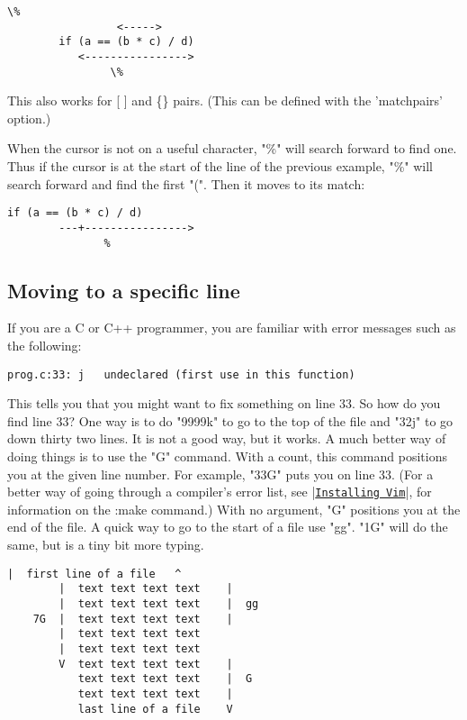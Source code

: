 \begin{Verbatim}[samepage=true]
                   \%
                 <----->
        if (a == (b * c) / d) 
           <---------------->
                \%
\end{Verbatim}

This also works for [ ] and \{\} pairs.
(This can be defined with the 'matchpairs' option.)

When the cursor is not on a useful character, "\%" will search forward to find one.
Thus if the cursor is at the start of the line of the previous example, "\%" will search forward and find the first "(".
Then it moves to its match:

\begin{Verbatim}[samepage=true]
        if (a == (b * c) / d) 
        ---+---------------->
               %
\end{Verbatim}


\subsection{Moving to a specific line}

If you are a C or C++ programmer, you are familiar with error messages such as the following:

		\begin{Verbatim}[samepage=true]
    prog.c:33: j   undeclared (first use in this function) 
		\end{Verbatim}

This tells you that you might want to fix something on line 33.
So how do you find line 33?  One way is to do "9999k" to go to the top of the file and "32j" to go down thirty two lines.
It is not a good way, but it works.
A much better way of doing things is to use the "G" command.
With a count, this command positions you at the given line number.
For example, "33G" puts you on line 33.
(For a better way of going through a compiler's error list, see |\hyperref[Installing Vim]{\texttt{Installing Vim}}|, for information on the :make command.) With no argument, "G" positions you at the end of the file.
A quick way to go to the start of a file use "gg".
"1G" will do the same, but is a tiny bit more typing.
 
\begin{Verbatim}[samepage=true]
        |  first line of a file   ^
        |  text text text text    |
        |  text text text text    |  gg
    7G  |  text text text text    |
        |  text text text text
        |  text text text text
        V  text text text text    |
           text text text text    |  G
           text text text text    |
           last line of a file    V
\end{Verbatim}

